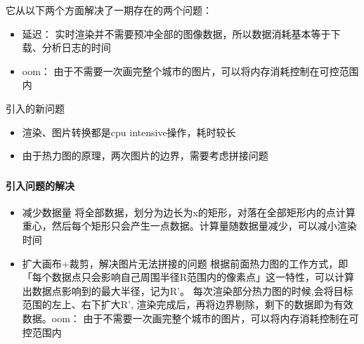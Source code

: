\documentclass[c]{beamer}
\begin{document}
\begin{CJK}{UTF8}{song}
\begin{frame}
    它从以下两个方面解决了一期存在的两个问题：
    
    \begin{itemize}
      \item 延迟： 实时渲染并不需要预冲全部的图像数据，所以数据消耗基本等于下载、分析日志的时间
      \item oom： 由于不需要一次画完整个城市的图片，可以将内存消耗控制在可控范围内
    \end{itemize}

    \hmsnd{}引入的新问题
    \begin{itemize}
      \item 渲染、图片转换都是cpu intensive操作，耗时较长
      \item 由于热力图的原理，两次图片的边界，需要考虑拼接问题
    \end{itemize}
\end{frame}
\begin{frame}\frametitle{\hmsnd{}}
    \framesubtitle{\rtrd{}引入问题的解决}
    
    \begin{itemize}
      \item 减少数据量
        将全部数据，划分为边长为x的矩形，对落在全部矩形内的点计算重心，然后每个矩形只会产生一点数据。计算量随数据量减少，可以减小渲染时间

      \item 扩大画布+裁剪，解决图片无法拼接的问题
        根据前面热力图的工作方式，即「每个数据点只会影响自己周围半径R范围内的像素点」这一特性，可以计算出数据点影响到的最大半径，记为R'。
        每次渲染部分热力图的时候,会将目标范围的左上、右下扩大R', 渲染完成后，再将边界剔除，剩下的数据即为有效数据。oom： 由于不需要一次画完整个城市的图片，可以将内存消耗控制在可控范围内
    \end{itemize}
\end{frame}

%

\end{CJK}
\end{document}

